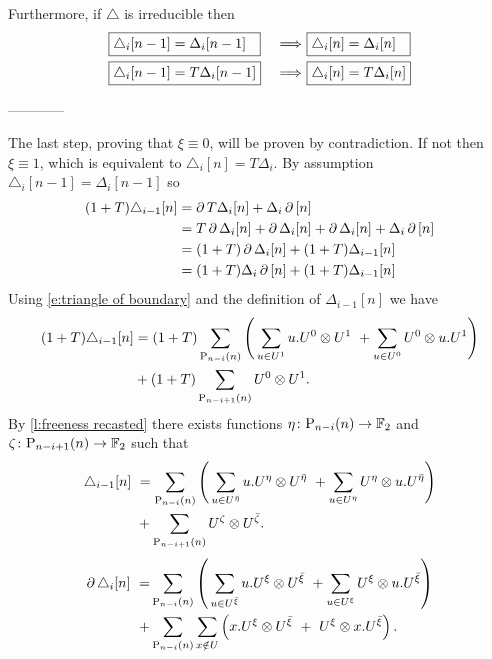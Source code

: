 
Furthermore, if $\triangle$ is irreducible then
\begin{alignat*}{2}
&\boxed{\triangle_i [n-1] = \Delta_i [n-1] \hspace*{7pt}}\ &\Longrightarrow\
&\boxed{\triangle_i [n] = \Delta_i [n] \hspace*{7pt}} \\
&\boxed{\triangle_i [n-1] = T \Delta_i [n-1]}\ &\Longrightarrow\
&\boxed{\triangle_i [n] = T \Delta_i [n]}
\end{alignat*}

------------


The last step, proving that $\xi \equiv 0$, will be proven by contradiction.
If not then $\xi \equiv 1$, which is equivalent to $\triangle_i [n] = T \Delta_i$.
By assumption $\triangle_i [n-1] = \Delta_i [n-1]$ so
\begin{align*}
(1+T) \triangle_{i-1}[n] &=
\operatorname{\partial} T \Delta_i [n] + \Delta_i \operatorname{\partial} \, [n] \\ &=
T \operatorname{\partial} \Delta_i [n] + \operatorname{\partial} \Delta_i [n] + \operatorname{\partial} \Delta_i [n] + \Delta_i \operatorname{\partial} \, [n] \\ &=
(1+T) \operatorname{\partial} \Delta_i [n] + (1+T) \Delta_{i-1} [n] \\ &=
(1+T) \Delta_i \operatorname{\partial} \, [n] + (1+T) \Delta_{i-1} [n]
\end{align*}
Using \eqref{e:triangle of boundary} and the definition of $\Delta_{i-1} [n]$ we have
\begin{align*}
(1+T) \triangle_{i-1}[n] &=
(1+T) \sum_{\mathrm{P}_{n-i}(n)} \left( \,
\sum_{u \in U^1} {u.U^0} \otimes {U^1} \ +
\sum_{u \in U^0} {U^0} \otimes {u.U^1} \right) \\ &+
(1+T) \sum_{\mathrm{P}_{n-i+1}(n)} U^0 \otimes U^1.
\end{align*}
By \cref{l:freeness recasted} there exists functions $\eta \colon \mathrm{P}_{n-i}(n) \to {\mathbb{F}_2}$ and $\zeta \colon \mathrm{P}_{n-i+1}(n) \to {\mathbb{F}_2}$ such that
\begin{align*}
\triangle_{i-1}[n] \ &=
\sum_{\mathrm{P}_{n-i}(n)} \left( \,
\sum_{u \in U^{\bar{\eta}}} u.U^\eta \otimes U^{\bar{\eta}} \ +
\sum_{u \in U^\eta} U^\eta \otimes u.U^{\bar{\eta}} \right) \\ &+
\sum_{\mathrm{P}_{n-i+1}(n)} U^\zeta \otimes U^{\bar{\zeta}}.
\end{align*}
\begin{align*}
\label{equation: boundary of triangle}
\bd \triangle_i [n]\ = &
\sum_{\P_{n-i}(n)} \left( \, \sum_{u \in U^\barxi} u.U^\xi \ot U^\barxi \ +
\sum_{u \in U^\xi} U^\xi \ot u.U^\barxi \right) \\ + &
\sum_{\P_{n-i}(n)} \sum_{x \notin U} \left( x.U^\xi \ot U^\barxi \ +\ U^\xi \ot {x.U^\barxi} \right).
\end{align*}



